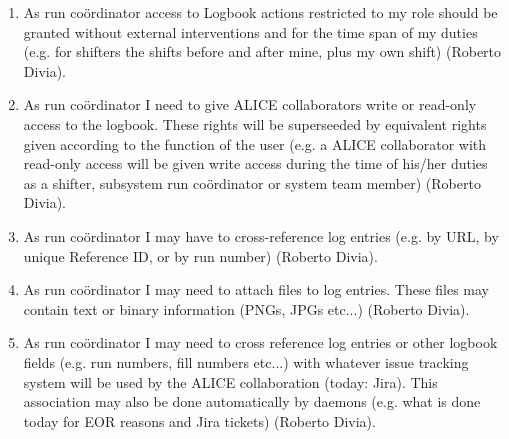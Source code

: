 \begin{enumerate}
  \item As run co\"ordinator access to Logbook actions restricted to my role should be granted without external interventions and for the time span of my duties (e.g. for shifters the shifts before and after mine, plus my own shift) (Roberto Divia).
  \item As run co\"ordinator I need to give ALICE collaborators write or read-only access to the logbook. These rights will be superseeded by equivalent rights given according to the function of the user (e.g. a ALICE collaborator with read-only access will be given write access during the time of his/her duties as a shifter, subsystem run co\"ordinator or system team member) (Roberto Divia).
  \item As run co\"ordinator I may have to cross-reference log entries (e.g. by URL, by unique Reference ID, or by run number)  (Roberto Divia).
  \item  As run co\"ordinator I may need to attach files to log entries. These files may contain text or binary information (PNGs, JPGs etc...) (Roberto Divia).
  \item As run co\"ordinator I may need to cross reference log entries or other logbook fields (e.g. run numbers, fill numbers etc...) with whatever issue tracking system will be used by the ALICE collaboration (today: Jira). This association may also be done automatically by daemons (e.g. what is done today for EOR reasons and Jira tickets) (Roberto Divia).
\end{enumerate}

